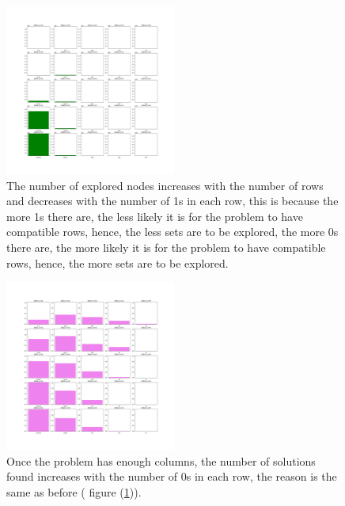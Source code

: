\documentclass{beamer}
\begin{document}
\begin{frame}{}
    \begin{figure}
        \centering
        \includegraphics[width=0.5\textwidth]{explored_nodes_prob.pdf}
        \caption{The number of explored nodes increases with the number of rows and 
        decreases with the number of 1s in each row, this is because the more 1s there are,
        the less likely it is for the problem to have compatible rows, hence, the less sets 
        are to be explored, the more 0s there are, the more likely it is for the problem
        to have compatible rows, hence, the more sets are to be explored.}
        \label{fig:explored_nodes_prob}
    \end{figure}
\end{frame}

\begin{frame}{}
    \begin{figure}
        \centering
        \includegraphics[width=0.5\textwidth]{solutions_prob.pdf}
        \caption{Once the problem has enough columns, the number of solutions found 
        increases with the number of 0s in each row, the reason is the same as before (
        figure (\ref{fig:explored_nodes_prob})).}
        \label{fig:solutions_prob}
    \end{figure}
\end{frame}
\end{document}
